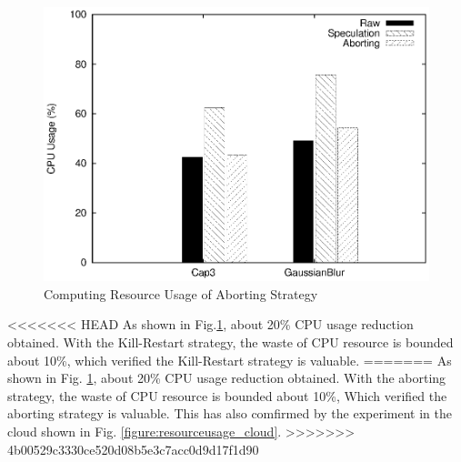 \begin{figure}
\centering
\includegraphics[width=0.9\columnwidth]{figures/abort_resource_usage.eps}
\caption{Computing Resource Usage of Aborting Strategy}
\label{figure:abort_resourceusage}
\end{figure}

<<<<<<< HEAD
As shown in Fig.\ref{figure:abort_resourceusage}, about 20\% CPU usage reduction obtained. With the Kill-Restart strategy, the waste of CPU resource is bounded about 10\%, which verified the Kill-Restart strategy is valuable.
=======
As shown in Fig. \ref{figure:abort_resourceusage}, about 20\% CPU usage reduction obtained. With the aborting strategy, the waste of CPU resource is bounded about 10\%, Which verified the aborting strategy is valuable. This has also comfirmed by the experiment in the cloud shown in Fig. \ref{figure:resourceusage_cloud}.
>>>>>>> 4b00529c3330ce520d08b5e3c7acc0d9d17f1d90
